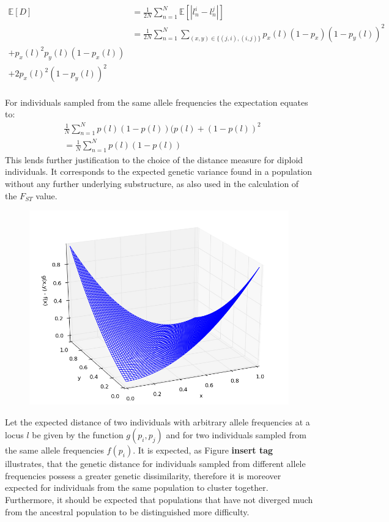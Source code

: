 \documentclass[a4paper, 11pt]{article}
\begin{document}
\begin{align*}
\mathbb{E}[D] &= \frac{1}{2N}\sum^{N}_{n = 1} \mathbb{E}[|l^i_n - l^j_n|] \\
&= \frac{1}{2N} \sum^{N}_{n = 1} \sum_{(x, y) \in \{(j, i), (i, j)\}} p_x(l)(1-p_x)(1-p_y(l))^2 \\
+ p_x(l)^2p_y(l)(1-p_x(l)) \\
+ 2p_x(l)^2(1-p_y(l))^2
\end{align*} \\
For individuals sampled from the same allele frequencies the expectation equates to:
\begin{align*}
& \frac{1}{N} \sum^{N}_{n = 1} p(l)(1-p(l))(p(l)+(1-p(l))^2 \\
&= \frac{1}{N} \sum^{N}_{n = 1} p(l)(1-p(l))
\end{align*}
This lends further justification to the choice of the distance measure for diploid individuals. It corresponds to the expected genetic variance found in a population without any further underlying substructure, as also used in the calculation of the $F_{ST}$ value.\\
\begin{figure}
\includegraphics[scale=0.5]{plot_distance}
\end{figure}
Let the expected distance of two individuals with arbitrary allele frequencies at a locus $l$ be given by the function $g(p_i, p_j)$ and for two individuals sampled from the same allele frequencies $f(p_i)$. It is expected, as Figure \textbf{insert tag} illustrates, that the genetic distance for individuals sampled from different allele frequencies possess a greater genetic dissimilarity, therefore it is moreover expected for individuals from the same population to cluster together. Furthermore, it should be expected that populations that have not diverged much from the ancestral population to be distinguished more difficulty.\\
\end{document}
